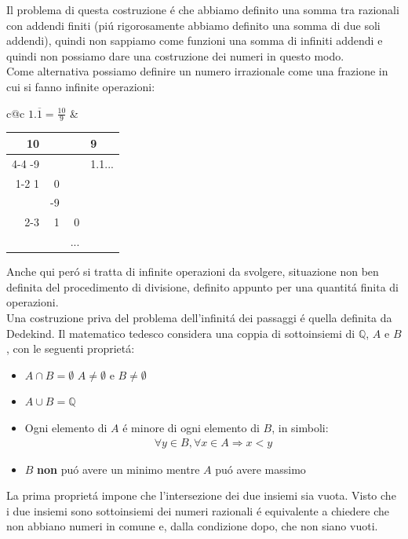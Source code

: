 \documentclass[twoside]{article} %
\begin{document}
	 Il problema di questa costruzione \'e che abbiamo definito una somma tra razionali con addendi finiti (pi\'u rigorosamente abbiamo definito una somma di due soli addendi), quindi non sappiamo come funzioni una somma di infiniti addendi e quindi non possiamo dare una costruzione dei numeri in questo modo.\\
	 Come alternativa possiamo definire un numero irrazionale come una frazione in cui si fanno infinite operazioni:
	 \begin{center}
		\begin{tabular}{c@{\hskip 50pt}c}
	 			$1.\overline{1}=\frac{10}{9}$  &
				\begin{tabular}{r@{\hskip -3pt}r@{\hskip -3pt}r|l}
					10&&&9\\ \cline{4-4}
					-9&&&1.1...\\ \cline{1-2}
					1&0&&\\
					&-9&&\\	\cline{2-3}
					&1&0&\\
					&&...
				\end{tabular}
		\end{tabular}	
	\end{center} 
	\newpage	
	\noindent Anche qui per\'o si tratta di infinite operazioni da svolgere, situazione non ben definita del procedimento di divisione, definito appunto per una quantit\'a finita di operazioni.\\
	Una costruzione priva del problema dell'infinit\'a dei passaggi \'e quella definita da Dedekind. Il matematico tedesco considera una coppia di sottoinsiemi di $\mathbb{Q}$, $A$ e $B$, con le seguenti propriet\'a:
	\begin{itemize}
		\item $A\cap B=\emptyset$  $A\neq \emptyset$ e $B\neq \emptyset$
		\item $A\cup B=\mathbb{Q}$
		\item Ogni elemento di $A$ \'e minore di ogni elemento di $B$, in simboli:
		\begin{gather*}
			 \forall y\in B,  \forall x\in A\Rightarrow x<y 
		\end{gather*} 
		\item $B$ \textbf{non} pu\'o avere un minimo mentre $A$ pu\'o avere massimo
	\end{itemize}
	La prima propriet\'a impone che l'intersezione dei due insiemi sia vuota. Visto che i due insiemi sono sottoinsiemi dei numeri razionali \'e equivalente a chiedere che non abbiano numeri in comune e, dalla condizione dopo, che non siano vuoti.\\
\end{document}
